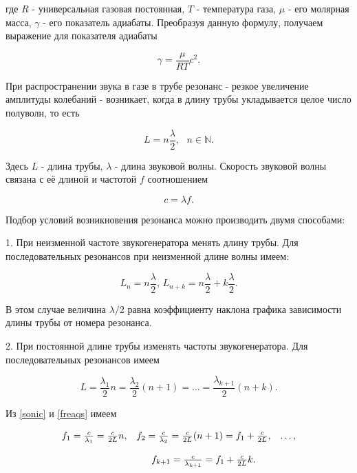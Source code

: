 \documentclass[a4paper,12pt]{article} %
\begin{document}
где $R$ - универсальная газовая постоянная, $T$ - температура газа, $\mu$ - его молярная масса, $\gamma$ - его показатель адиабаты. Преобразуя данную формулу, получаем выражение для показателя адиабаты

\begin{equation}
    \gamma = \frac{\mu}{RT}c^2.
    \label{gamma}
\end{equation}

При распространении звука в газе в трубе резонанс - резкое увеличение амплитуды колебаний - возникает, когда в длину трубы укладывается целое число полуволн, то есть

\begin{equation}
    L = n\frac{\lambda}{2}, \text{    } n \in \mathbb{N}.
\end{equation}

Здесь $L$ - длина трубы, $\lambda$ - длина звуковой волны. Скорость звуковой волны связана с её длиной и частотой $f$ соотношением 

\begin{equation}
    c = \lambda f.
    \label{sonic}
\end{equation}

Подбор условий возникновения резонанса можно производить двумя способами:

1. При неизменной частоте звукогенератора менять длину трубы. Для последовательных резонансов при неизменной длине волны имеем:

\begin{equation}
    L_n = n\frac{\lambda}{2} \text{,        } L_{n + k} = n\frac{\lambda}{2} + k\frac{\lambda}{2}.
    \label{cor1}
\end{equation}

В этом случае величина $\lambda/2$ равна коэффициенту наклона графика зависимости длины трубы от номера резонанса.

2. При постоянной длине трубы изменять частоты звукогенератора. Для последовательных резонансов имеем

\begin{equation}
    L = \frac{\lambda_1}{2}n = \frac{\lambda_2}{2}(n + 1) = \dots = \frac{\lambda_{k+1}}{2}(n + k).
    \label{freaqs}
\end{equation}

Из \eqref{sonic} и \eqref{freaqs} имеем

\begin{equation*}
    \begin{array}{ccc}
    \centering
        f_1 = \frac{c}{\lambda_1} = \frac{c}{2L}n, & f_2 = \frac{c}{\lambda_2} = \frac{c}{2L}(n + 1) = f_1 + \frac{c}{2L}, & \dots ,\\ \\
        & f_{k + 1} = \frac{c}{\lambda_{k+1}} = f_1 + \frac{c}{2L}k.
    \end{array}
\end{equation*}
\end{document}

